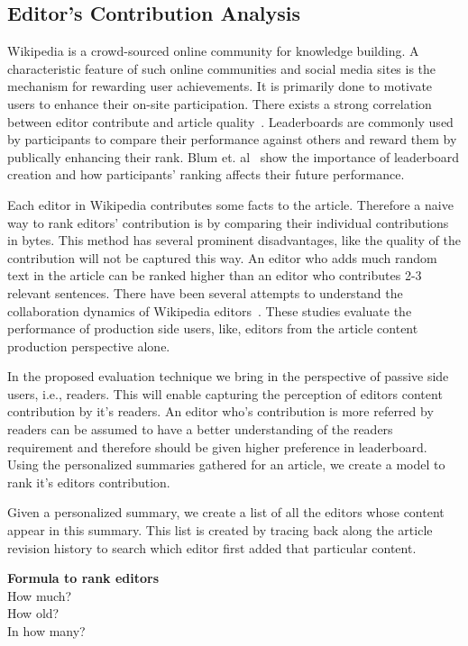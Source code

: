 \documentclass[12pt]{article}
\begin{document}
    
\subsection{Editor's Contribution Analysis}
Wikipedia is a crowd-sourced online community for knowledge building. A characteristic feature of such online communities and social media sites is the mechanism for rewarding user achievements. It is primarily done to motivate users to enhance their on-site participation. There exists a strong correlation between editor contribute and article quality~\cite{li2015automatically}. 
Leaderboards are commonly used by participants to compare their performance against others and reward them by publically enhancing their rank. Blum et. al~\cite{blum2015ladder} show the importance of leaderboard creation and how participants' ranking affects their future performance.

Each editor in Wikipedia contributes some facts to the article. Therefore a naive way to rank editors' contribution is by comparing their individual contributions in bytes. This method has several prominent disadvantages, like the quality of the contribution will not be captured this way. An editor who adds much random text in the article can be ranked higher than an editor who contributes 2-3 relevant sentences. There have been several attempts to understand the collaboration dynamics of Wikipedia editors~\cite{kim2016understanding, sepehri2012leveraging, wagner2016women}. These studies evaluate the performance of production side users, like, editors from the article content production perspective alone. 

In the proposed evaluation technique we bring in the perspective of passive side users, i.e., readers. This will enable capturing the perception of editors content contribution by it's readers. An editor who's contribution is more referred by readers can be assumed to have a better understanding of the readers requirement and therefore should be given higher preference in leaderboard. Using the personalized summaries gathered for an article, we create a model to rank it's editors contribution. 

Given a personalized summary, we create a list of all the editors whose content appear in this summary. This list is created by tracing back along the article revision history to search which editor first added that particular content. 

\textbf{Formula to rank editors}\\
How much?\\
How old?\\
In how many?\\
\end{document}
